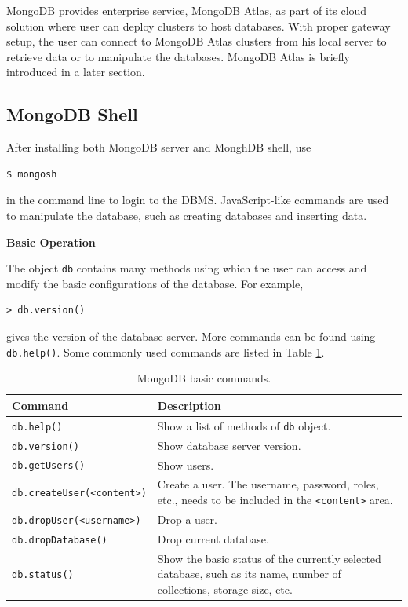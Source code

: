 MongoDB provides enterprise service, MongoDB Atlas, as part of its cloud solution where user can deploy clusters to host databases. With proper gateway setup, the user can connect to MongoDB Atlas clusters from his local server to retrieve data or to manipulate the databases. MongoDB Atlas is briefly introduced in a later section.

\subsection{MongoDB Shell}

After installing both MongoDB server and MonghDB shell, use
\begin{lstlisting}
$ mongosh
\end{lstlisting}
in the command line to login to the DBMS. JavaScript-like commands are used to manipulate the database, such as creating databases and inserting data.

\vspace{0.1in}
\noindent \textbf{Basic Operation}
\vspace{0.1in}

The object \verb|db| contains many methods using which the user can access and modify the basic configurations of the database. For example,
\begin{lstlisting}
> db.version()
\end{lstlisting}
gives the version of the database server. More commands can be found using \verb|db.help()|. Some commonly used commands are listed in Table \ref{ch:db:tab:mongodbbasics}.
\begin{table}
	\centering \caption{MongoDB basic commands.}\label{ch:db:tab:mongodbbasics}
	\begin{tabularx}{\textwidth}{lX}
		\hline
		Command & Description \\ \hline
        \verb|db.help()| & Show a list of methods of \verb|db| object. \\ 
		\verb|db.version()| & Show database server version. \\ 
        \verb|db.getUsers()| & Show users. \\ 
        \verb|db.createUser(<content>)| & Create a user. The username, password, roles, etc., needs to be included in the \verb|<content>| area. \\ 
        \verb|db.dropUser(<username>)| & Drop a user. \\ 
        \verb|db.dropDatabase()| & Drop current database. \\ 
		\verb|db.status()| & Show the basic status of the currently selected database, such as its name, number of collections, storage size, etc.  \\
		 \hline
	\end{tabularx}
\end{table}

